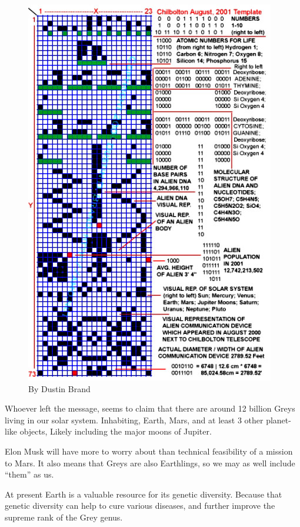 \documentclass{report}
\begin{document}
\begin{figure}
  \includegraphics[width=\textwidth]{photograph/chibolton-analysis.jpg}
\caption{By Dustin Brand\cite{contact}}\label{chi:analysis}
\end{figure}

Whoever left the message, seems to claim that there are around 12 billion
Greys living in our solar system. Inhabiting, Earth, Mars, and at least 3 other
planet-like objects, Likely including the major moons of Jupiter. 

Elon Musk will have more to worry about than technical feasibility of a mission
to Mars. It also means that Greys are also Earthlings, so we may as well include
``them'' as us. 

At present Earth is a valuable resource for its genetic diversity. Because that
genetic diversity can help to cure various diseases, and further improve the
supreme rank of the Grey genus. 
\end{document}
